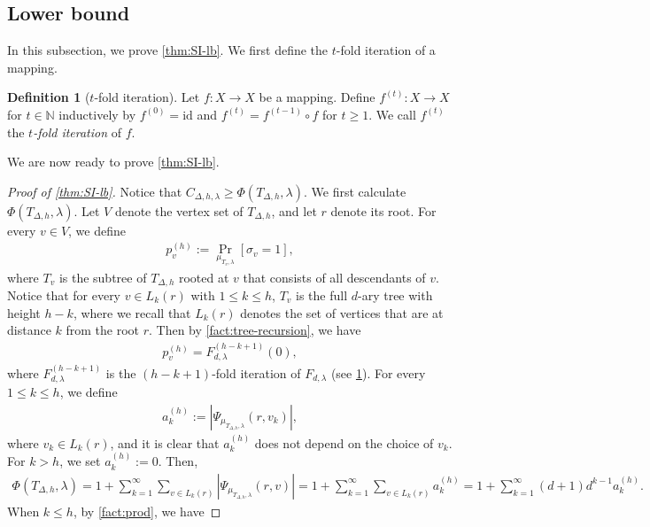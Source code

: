 \documentclass[11pt]{article}
\theoremstyle{plain}
\theoremstyle{definition}
\newtheorem{definition}[theorem]{Definition}
\theoremstyle{remark}
\newcommand{\N}{\mathbb{N}}
\def\oPr{\mathop{\mathrm{Pr}}}
\renewcommand{\Pr}[2][]{
  \oPr_{#1}\left[#2\right] } %
\begin{document}
\subsection{Lower bound}

In this subsection, we prove \cref{thm:SI-lb}.
We first define the $t$-fold iteration of a mapping.
\begin{definition}[$t$-fold iteration]\label{def:t-fold-iter}
    Let $f:X \rightarrow X$ be a mapping.
    Define $f^{(t)}:X\rightarrow X$ for $t\in \N$ inductively by $f^{(0)} = \mathrm{id}$ and $f^{(t)} = f^{(t-1)} \circ f$ for $t \ge 1$.
    We call $f^{(t)}$ the \emph{$t$-fold iteration} of $f$.
\end{definition}
We are now ready to prove \cref{thm:SI-lb}.
\begin{proof}[Proof of \cref{thm:SI-lb}]
    Notice that $C_{\Delta,h,\lambda}\geq \Phi(T_{\Delta,h},\lambda)$.
    We first calculate $\Phi(T_{\Delta,h},\lambda)$.
    Let $V$ denote the vertex set of $T_{\Delta,h}$, and let $r$ denote its root.
    For every $v\in V$, we define 
    \begin{align*}
	p_v^{(h)} := \Pr[\mu_{T_v,\lambda}]{\sigma_v = 1},
    \end{align*}
where $T_v$ is the subtree of $T_{\Delta,h}$ rooted at $v$ that consists of all descendants of $v$.
Notice that for every $v\in L_k(r)$ with $1\leq k\leq h$, $T_v$ is the full $d$-ary tree with height $h-k$, where we recall that $L_k(r)$ denotes the set of vertices that are at distance $k$ from the root $r$.
Then by \cref{fact:tree-recursion}, we have
\begin{align}\label{eq:p_k^h}
    p_{v}^{(h)}=F^{(h-k+1)}_{d,\lambda}(0),
\end{align}
where $F_{d,\lambda}^{(h-k+1)}$ is the $(h-k+1)$-fold iteration of $F_{d,\lambda}$ (see \cref{def:t-fold-iter}).
For every $1\leq k\leq h$, we define 
\begin{align*}
    a_k^{(h)}:=\left| \Psi_{\mu_{T_{\Delta,h},\lambda}}(r,v_k) \right|,
\end{align*}
where $v_k\in L_k(r)$, and it is clear that $a_k^{(h)}$ does not depend on the choice of $v_k$.
For $k>h$, we set $a_k^{(h)}:=0$.
Then, 
\begin{align*}
    \Phi(T_{\Delta,h},\lambda)
    =1+\sum_{k=1}^{\infty} \sum_{v\in L_k(r)} \left| \Psi_{\mu_{T_{\Delta,h},\lambda}}(r,v) \right|
    =1+\sum_{k=1}^{\infty} \sum_{v\in L_k(r)}a_k^{(h)}
    =1+\sum_{k=1}^{\infty} (d+1)d^{k-1}a_k^{(h)}.
\end{align*}
When $k\leq h$, by \cref{fact:prod}, we have

\end{proof}
\end{document}
